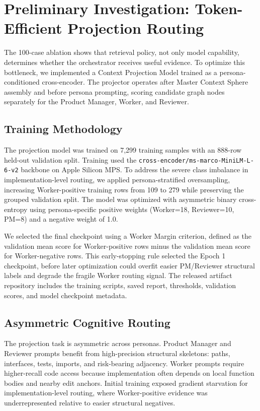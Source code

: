 \section{Preliminary Investigation: Token-Efficient Projection Routing}
\label{sec:projection}

The 100-case ablation shows that retrieval policy, not only model capability, determines whether the orchestrator receives useful evidence. To optimize this bottleneck, we implemented a Context Projection Model trained as a persona-conditioned cross-encoder. The projector operates after Master Context Sphere assembly and before persona prompting, scoring candidate graph nodes separately for the Product Manager, Worker, and Reviewer.

\subsection{Training Methodology}

The projection model was trained on 7{,}299 training samples with an 888-row held-out validation split. Training used the \texttt{cross-encoder/ms-marco-MiniLM-L-6-v2} backbone on Apple Silicon MPS. To address the severe class imbalance in implementation-level routing, we applied persona-stratified oversampling, increasing Worker-positive training rows from 109 to 279 while preserving the grouped validation split. The model was optimized with asymmetric binary cross-entropy using persona-specific positive weights (Worker=18, Reviewer=10, PM=8) and a negative weight of 1.0.

We selected the final checkpoint using a Worker Margin criterion, defined as the validation mean score for Worker-positive rows minus the validation mean score for Worker-negative rows. This early-stopping rule selected the Epoch 1 checkpoint, before later optimization could overfit easier PM/Reviewer structural labels and degrade the fragile Worker routing signal. The released artifact repository includes the training scripts, saved report, thresholds, validation scores, and model checkpoint metadata.

\subsection{Asymmetric Cognitive Routing}

The projection task is asymmetric across personas. Product Manager and Reviewer prompts benefit from high-precision structural skeletons: paths, interfaces, tests, imports, and risk-bearing adjacency. Worker prompts require higher-recall code access because implementation often depends on local function bodies and nearby edit anchors. Initial training exposed gradient starvation for implementation-level routing, where Worker-positive evidence was underrepresented relative to easier structural negatives.

